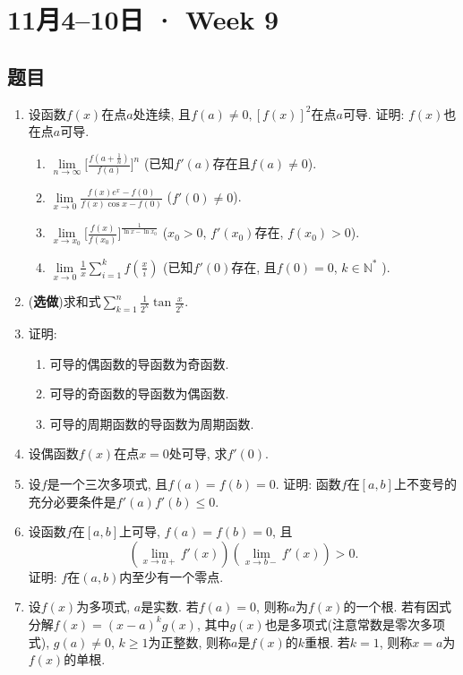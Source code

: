 \documentclass[UTF8,11pt, a4paper, oneside, fontset=none]{ctexbook}
\begin{document}
\clearpage

\section{11月4--10日 · Week 9}

\subsection*{题目}

\begin{enumerate}
\item 设函数$f(x)$在点$a$处连续, 且$f(a) \neq 0, [f(x)]^2$在点$a$可导. 证明: $f(x)$也在点$a$可导. 
\begin{enumerate}
\item $\lim\limits_{n \to \infty} \Big[\frac{f(a + \frac{1}{n})}{f(a)}\Big]^n$ (已知$f'(a)$存在且$f(a) \neq 0$).
\item $\lim\limits_{x \to 0} \frac{f(x) e^x -f(0)}{f(x) \cos x - f(0)}$ ($f'(0) \neq 0$).
\item $\lim\limits_{x \to x_0} \Big[ \frac{f(x)}{f(x_0)}\Big]^{\frac{1}{\ln x- \ln x_0}}$ ($x_0>0$, $f'(x_0)$存在, $f(x_0)>0$).
\item $\lim\limits_{x \to 0} \frac{1}{x} \sum_{i=1}^k f\left( \frac{x}{i}\right)$ (已知$f'(0)$存在, 且$f(0) =0$, $k \in \mathbb N^*$ ).
\end{enumerate}

\item ({\bf 选做})求和式$\sum_{k=1}^n \frac{1}{2^k} \tan \frac{x}{2^k} $. 


\item 证明:
\begin{enumerate}
\item 可导的偶函数的导函数为奇函数.
\item 可导的奇函数的导函数为偶函数.
\item 可导的周期函数的导函数为周期函数.
\end{enumerate}
\item 设偶函数$f(x)$在点$x=0$处可导, 求$f'(0)$.
\item 设$f$是一个三次多项式, 且$f(a) =f(b) =0$. 证明: 函数$f$在$[a, b]$上不变号的充分必要条件是$f'(a) f'(b) \leq 0$.
\item 设函数$f$在$[a, b]$上可导, $f(a) = f(b) =0$, 且
\[
(\lim_{x \to a+} f'(x)) (\lim_{x \to b-} f'(x)) >0.
\]
证明: $f$在$(a, b)$内至少有一个零点.


\item 设$f(x)$为多项式, $a$是实数. 若$f(a) =0$, 则称$a$为$f(x)$的一个根. 若有因式分解$f(x) = (x - a)^k g(x)$, 其中$g(x)$也是多项式(注意常数是零次多项式), $g(a) \neq 0$, $k \geq 1$为正整数, 则称$a$是$f(x)$的$k$重根. 若$k=1$, 则称$x = a$为$f(x)$的单根. 



\end{enumerate}
\end{document}
